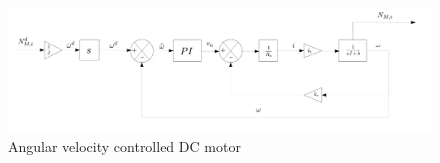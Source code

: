 %
\begin{figure}[H]
	\centering
	\includegraphics[width=0.9\linewidth]{figures/omegaControl}
	\caption{Angular velocity controlled DC motor}
	\label{fig:blockdi}
\end{figure}
%

% 

%

%
